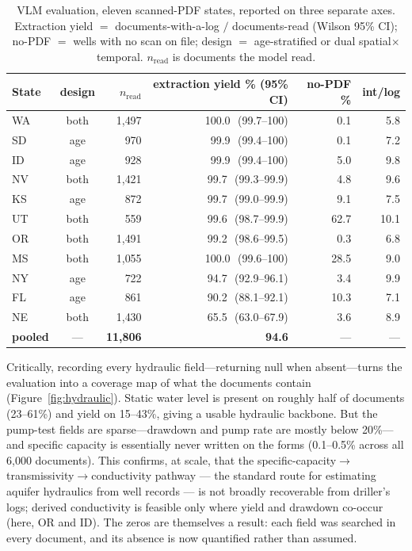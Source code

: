 \documentclass[12pt]{article}
\begin{document}
\begin{table}[t]\centering\small
\caption{VLM evaluation, eleven scanned-PDF states, reported on three separate axes. Extraction yield
$=$ documents-with-a-log $/$ documents-read (Wilson 95\% CI); no-PDF $=$ wells with no scan on file;
design $=$ age-stratified or dual spatial$\times$temporal. $n_{\mathrm{read}}$ is documents the model read.}
\label{tab:yield}
\begin{tabular}{l c r r r r}
\toprule
State & design & $n_{\mathrm{read}}$ & extraction yield \% (95\% CI) & no-PDF \% & int/log \\
\midrule
WA & both & 1{,}497 & 100.0\ \,(99.7--100) & 0.1 & 5.8 \\
SD & age & 970 & 99.9\ \,(99.4--100) & 0.1 & 7.2 \\
ID & age & 928 & 99.9\ \,(99.4--100) & 5.0 & 9.8 \\
NV & both & 1{,}421 & 99.7\ \,(99.3--99.9) & 4.8 & 9.6 \\
KS & age & 872 & 99.7\ \,(99.0--99.9) & 9.1 & 7.5 \\
UT & both & 559 & 99.6\ \,(98.7--99.9) & 62.7 & 10.1 \\
OR & both & 1{,}491 & 99.2\ \,(98.6--99.5) & 0.3 & 6.8 \\
MS & both & 1{,}055 & 100.0\ \,(99.6--100) & 28.5 & 9.0 \\
NY & age & 722 & 94.7\ \,(92.9--96.1) & 3.4 & 9.9 \\
FL & age & 861 & 90.2\ \,(88.1--92.1) & 10.3 & 7.1 \\
NE & both & 1{,}430 & 65.5\ \,(63.0--67.9) & 3.6 & 8.9 \\
\midrule
\textbf{pooled} & --- & \textbf{11{,}806} & \textbf{94.6} & --- & --- \\
\bottomrule
\end{tabular}
\end{table}

Critically, recording every hydraulic field---returning null when absent---turns the evaluation
into a coverage map of what the documents contain (Figure~\ref{fig:hydraulic}). Static water level is
present on roughly half of documents (23--61\%) and yield on 15--43\%, giving a usable hydraulic backbone.
But the pump-test fields are sparse---drawdown and pump rate are mostly below 20\%---and specific
capacity is essentially never written on the forms (0.1--0.5\% across all 6{,}000 documents). This
confirms, at scale, that the specific-capacity$\rightarrow$transmissivity$\rightarrow$conductivity pathway
--- the standard route for estimating aquifer hydraulics from well records \citep{rotzoll2008} ---
is not broadly recoverable from driller's logs; derived conductivity is feasible only where yield
and drawdown co-occur (here, OR and ID). The zeros are themselves a result: each field was searched in
every document, and its absence is now quantified rather than assumed.
\end{document}
